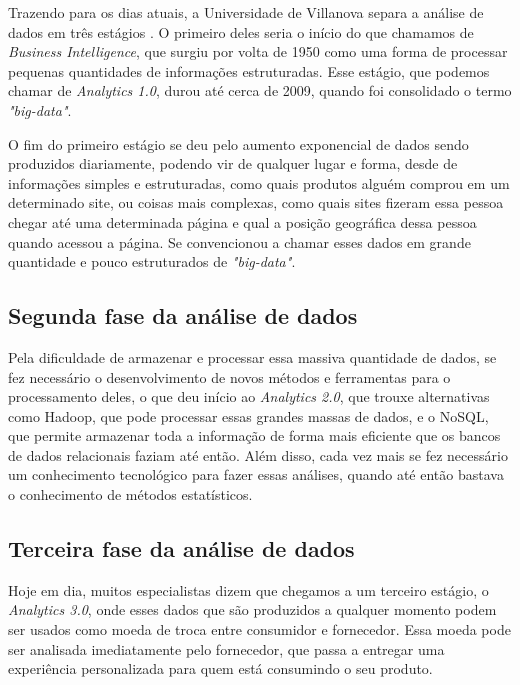 \indent
\par Trazendo para os dias atuais, a Universidade de Villanova separa a análise de dados em três estágios \cite{Villanova}. O primeiro deles seria o início do que chamamos de \textit{Business Intelligence}, que surgiu por volta de 1950 como uma forma de processar pequenas quantidades de informações estruturadas. Esse estágio, que podemos chamar de \textit{Analytics 1.0}, durou até cerca de 2009, quando foi consolidado o termo \textit{"big-data"}.

\par O fim do primeiro estágio se deu pelo aumento exponencial de dados sendo produzidos diariamente, podendo vir de qualquer lugar e forma, desde de informações simples e estruturadas, como quais produtos alguém comprou em um determinado site, ou coisas mais complexas, como quais sites fizeram essa pessoa chegar até uma determinada página e qual a posição geográfica dessa pessoa quando acessou a página. Se convencionou a chamar esses dados em grande quantidade e pouco estruturados de \textit{"big-data"}.

\subsection{Segunda fase da análise de dados}

\indent
\par Pela dificuldade de armazenar e processar essa massiva quantidade de dados, se fez necessário o desenvolvimento de novos métodos e ferramentas para o processamento deles, o que deu início ao \textit{Analytics 2.0}, que trouxe alternativas como Hadoop, que pode processar essas grandes massas de dados, e o NoSQL, que permite armazenar toda a informação de forma mais eficiente que os bancos de dados relacionais faziam até então. Além disso, cada vez mais se fez necessário um conhecimento tecnológico para fazer essas análises, quando até então bastava o conhecimento de métodos estatísticos.

\subsection{Terceira fase da análise de dados}

\indent
\par Hoje em dia, muitos especialistas dizem que chegamos a um terceiro estágio, o \textit{Analytics 3.0}, onde esses dados que são produzidos a qualquer momento podem ser usados como moeda de troca entre consumidor e fornecedor. Essa moeda pode ser analisada imediatamente pelo fornecedor, que passa a entregar uma experiência personalizada para quem está consumindo o seu produto.

